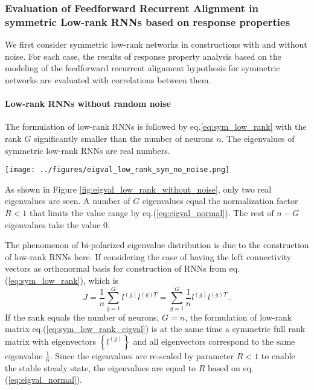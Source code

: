 \documentclass[11pt]{article}
\begin{document}
	\subsubsection{Evaluation of Feedforward Recurrent Alignment in symmetric Low-rank RNNs based on response properties}
	We first consider symmetric low-rank networks in constructions with and without noise. For each case, the results of response property analysis based on the modeling of the feedforward recurrent alignment hypothesis for symmetric networks are evaluated with correlations between them. 
	
	\paragraph{Low-rank RNNs without random noise}
	The formulation of low-rank RNNs is followed by eq.\ref{eq:sym_low_rank} with the rank $G$ significantly smaller than the number of neurons $n$. The eigenvalues of symmetric low-rank RNNs are real numbers. 
		\begin{SCfigure}[0.9][h] 
			\centering 
			\caption[Eigenvalue distribution of symmetric low-rank RNNs without random noise]{\textbf{Eigenvalue distribution of symmetric low-rank RNNs without random noise.} The eigenvalues of symmetric low-rank RNNs are real numbers (x-axis). With rank $G = 1 \ll n = 200$ the number of neurons, $1$ eigenvalue takes the value of normalization factor $R = 0.85$, and the rest $n-G = 199$ eigenvalues equal $0$. }
			\texttt{[image: ../figures/eigval\_low\_rank\_sym\_no\_noise.png]}
			\label{fig:eigval_low_rank_without_noise}
		\end{SCfigure}
	
	As shown in Figure \ref{fig:eigval_low_rank_without_noise}, only two real eigenvalues are seen. A number of $G$ eigenvalues equal the normalization factor $R < 1$ that limits the value range by eq.(\ref{eq:eigval_normal}). The rest of $n-G$ eigenvalues take the value $0$. 
	
	The phenomenon of bi-polarized eigenvalue distribution is due to the construction of low-rank RNNs here. If considering the case of having the left connectivity vectors as orthonormal basis for construction of RNNs from eq.(\ref{eq:sym_low_rank}), which is
		\begin{equation} \label{eq:sym_low_rank_eigval}
			J = \frac{1}{n}\sum_{g =1}^{G} l^{(g)} l^{(g)T} = \sum_{g =1}^{G} \frac{1}{n} l^{(g)} l^{(g)T}\, . 
		\end{equation}
	If the rank equals the number of neurons, $G = n$, the formulation of low-rank matrix eq.(\ref{eq:sym_low_rank_eigval}) is at the same time a symmetric full rank matrix with eigenvectors $\left\{l^{(g)}\right\}$ and all eigenvectors correspond to the same eigenvalue $\frac{1}{n}$. Since the eigenvalues are re-scaled by parameter $R < 1$ to enable the stable steady state, the eigenvalues are equal to $R$ based on eq.(\ref{eq:eigval_normal}). 
	
\end{document}
